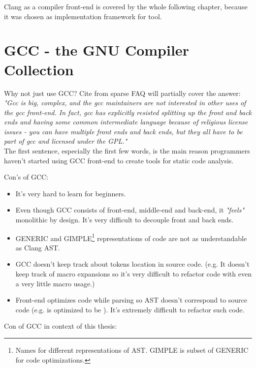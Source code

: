 Clang as a compiler front-end is covered by the whole following chapter, because it was chosen as implementation framework for tool. 

\section{GCC - the GNU Compiler Collection}
Why not just use GCC? Cite from sparse FAQ will partially cover the answer:\\

\emph{"Gcc is big, complex, and the gcc maintainers are not interested in other uses of the gcc front-end.  In fact, gcc has explicitly resisted splitting up the front and back ends and having some common intermediate language because of religious license issues - you can have multiple front ends and back ends, but they all have to be part of gcc and licensed under the GPL."}\\

The first sentence, especially the first few words, is the main reason programmers haven't started using GCC front-end to create tools for static code analysis.

Con's of GCC:

\begin{itemize}
\item It's very hard to learn for beginners.

\item Even though GCC consists of front-end, middle-end and back-end, it \textit{"feels"} monolithic by design. It's very difficult to decouple front and back ends.

\item GENERIC and GIMPLE\footnote{Names for different representations of AST. GIMPLE is subset of GENERIC for code optimizations.} representations of code are not as understandable as Clang AST.

\item GCC doesn't keep track about tokens location in source code. (e.g. It doesn't keep track of macro expansions so it's very difficult to refactor code with even a very little macro usage.)

\item Front-end optimizes code while parsing so AST doesn't correspond to source code (e.g.  is optimized to be ). It's extremely difficult to refactor such code.
\end{itemize}

Con of GCC in context of this thesis:

